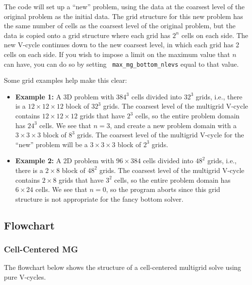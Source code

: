 The code will set up a ``new'' problem, using the data at the
coarsest level of the original problem as the initial data.  The grid
structure for this new problem has the same number of cells as the
coarsest level of the original problem, but the data is copied onto a
grid structure where each grid has $2^n$ cells on each side.  The new
V-cycle continues down to the new coarsest level, in which each grid
has 2 cells on each side.  If you wish to impose a limit on the
maximum value that $n$ can have, you can do so by setting {\tt
max\_mg\_bottom\_nlevs} equal to that value.

Some grid examples help make this clear:
\begin{itemize}
\item {\bf Example 1:} A 3D problem with $384^3$ cells divided into $32^3$
grids, i.e., there is a $12\times 12\times 12$ block of $32^3$ grids.
The coarsest level of the multigrid V-cycle contains $12\times
12\times 12$ grids that have $2^3$ cells, so the entire problem domain
has $24^3$ cells.  We see that $n=3$, and create a new problem domain
with a $3\times 3\times 3$ block of $8^3$ grids.  The coarsest level
of the multigrid V-cycle for the ``new'' problem will be a $3\times
3\times 3$ block of $2^3$ grids.

\item {\bf Example 2:} A 2D problem with $96\times 384$ cells divided into
$48^2$ grids, i.e., there is a $2\times 8$ block of $48^2$ grids.  The
coarsest level of the multigrid V-cycle contains $2\times 8$ grids
that have $3^2$ cells, so the entire problem domain has $6\times 24$
cells.  We see that $n=0$, so the program aborts since this grid
structure is not appropriate for the fancy bottom solver.
\end{itemize}




\subsection{Flowchart}



\subsubsection{Cell-Centered MG}

The flowchart below shows the structure of a cell-centered multigrid
solve using pure V-cycles.


